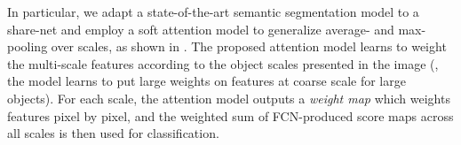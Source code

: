 In particular, we adapt a state-of-the-art semantic segmentation model \cite{chen2014semantic} to a share-net and employ a soft attention model \cite{bahdanau2014neural} to generalize average- and max-pooling over scales, as shown in . 
The proposed attention model learns to weight the multi-scale features according to the object scales presented in the image (\eg, the model learns to put large weights on features at coarse scale for large objects). 
For each scale, the attention model outputs a {\it weight map} which weights features pixel by pixel, and the weighted sum of FCN-produced score maps across all scales is then used for classification. %



